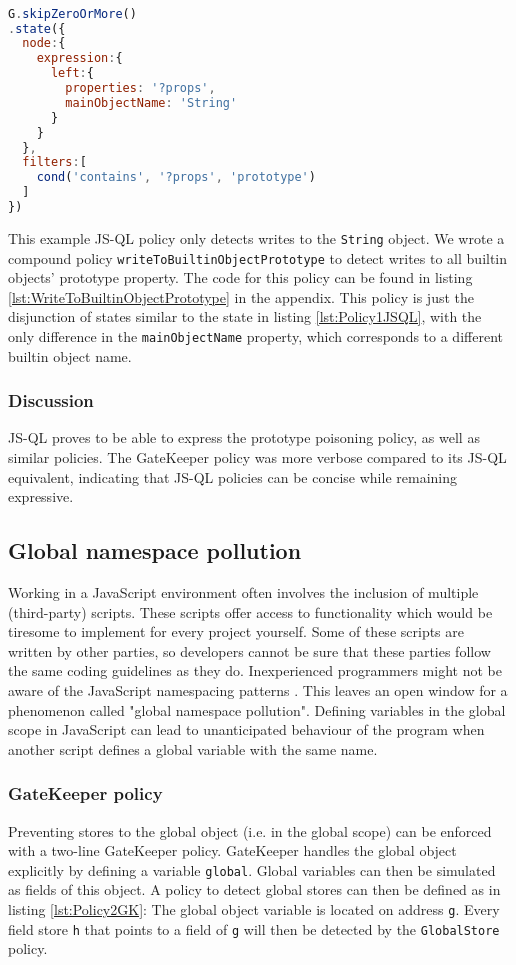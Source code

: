 \begin{lstlisting}[label={lst:Policy1JSQL},language=JavaScript,caption=Policy 1 in JS-QL,mathescape=true]  % float=t?

G.skipZeroOrMore()
.state({
  node:{
    expression:{
      left:{
        properties: '?props',
        mainObjectName: 'String'
      }
    }
  },
  filters:[
    cond('contains', '?props', 'prototype')
  ]
})

\end{lstlisting}

This example JS-QL policy only detects writes to the \texttt{String} object. We wrote a compound policy \texttt{writeToBuiltinObjectPrototype} to detect writes to all builtin objects' prototype property. The code for this policy can be found in listing \ref{lst:WriteToBuiltinObjectPrototype} in the appendix. This policy is just the disjunction of states similar to the state in listing \ref{lst:Policy1JSQL}, with the only difference in the \texttt{mainObjectName} property, which corresponds to a different builtin object name.

\subsubsection*{Discussion}
JS-QL proves to be able to express the prototype poisoning policy, as well as similar policies. The GateKeeper policy was more verbose compared to its JS-QL equivalent, indicating that JS-QL policies can be concise while remaining expressive.


\subsection{Global namespace pollution}


Working in a JavaScript environment often involves the inclusion of multiple (third-party) scripts. These scripts offer access to functionality which would be tiresome to implement for every project yourself. Some of these scripts are written by other parties, so developers cannot be sure that these parties follow the same coding guidelines as they do. Inexperienced programmers might not be aware of the JavaScript namespacing patterns \cite{JSNamespacing}. This leaves an open window for a phenomenon called "global namespace pollution". Defining variables in the global scope in JavaScript can lead to unanticipated behaviour of the program when another script defines a global variable with the same name.

\subsubsection*{GateKeeper policy}
Preventing stores to the global object (i.e. in the global scope) can be enforced with a two-line GateKeeper policy. GateKeeper handles the global object explicitly by defining a variable \texttt{global}. Global variables can then be simulated as fields of this object. A policy to detect global stores can then be defined as in listing \ref{lst:Policy2GK}: The global object variable is located on address \texttt{g}. Every field store \texttt{h} that points to a field of \texttt{g} will then be detected by the \texttt{GlobalStore} policy.

